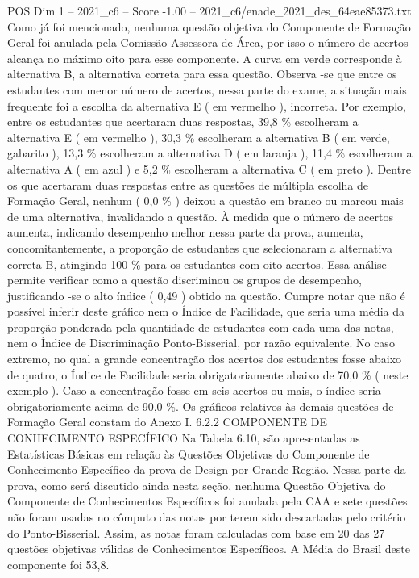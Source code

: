 \begin{textsample}{POS Dim 1 – 2021\_c6 – Score -1.00 – 2021\_c6/enade\_2021\_des\_64eae85373.txt}
Como já foi mencionado, nenhuma questão objetiva do Componente de Formação Geral foi anulada pela Comissão Assessora de Área, por isso o número de acertos alcança no máximo oito para esse componente.
A curva em verde corresponde à alternativa B, a alternativa correta para essa questão.
Observa -se que entre os estudantes com menor número de acertos, nessa parte do exame, a situação mais frequente foi a escolha da alternativa E ( em vermelho ), incorreta.
Por exemplo, entre os estudantes que acertaram duas respostas, 39,8 \% escolheram a alternativa E ( em vermelho ), 30,3 \% escolheram a alternativa B ( em verde, gabarito ), 13,3 \% escolheram a alternativa D ( em laranja ), 11,4 \% escolheram a alternativa A ( em azul ) e 5,2 \% escolheram a alternativa C ( em preto ).
Dentre os que acertaram duas respostas entre as questões de múltipla escolha de Formação Geral, nenhum ( 0,0 \% ) deixou a questão em branco ou marcou mais de uma alternativa, invalidando a questão.
À medida que o número de acertos aumenta, indicando desempenho melhor nessa parte da prova, aumenta, concomitantemente, a proporção de estudantes que selecionaram a alternativa correta B, atingindo 100 \% para os estudantes com oito acertos.
Essa análise permite verificar como a questão discriminou os grupos de desempenho, justificando -se o alto índice ( 0,49 ) obtido na questão.
Cumpre notar que não é possível inferir deste gráfico nem o Índice de Facilidade, que seria uma média da proporção ponderada pela quantidade de estudantes com cada uma das notas, nem o Índice de Discriminação Ponto-Bisserial, por razão equivalente.
No caso extremo, no qual a grande concentração dos acertos dos estudantes fosse abaixo de quatro, o Índice de Facilidade seria obrigatoriamente abaixo de 70,0 \% ( neste exemplo ).
Caso a concentração fosse em seis acertos ou mais, o índice seria obrigatoriamente acima de 90,0 \%.
Os gráficos relativos às demais questões de Formação Geral constam do Anexo I. 6.2.2 COMPONENTE DE CONHECIMENTO ESPECÍFICO Na Tabela 6.10, são apresentadas as Estatísticas Básicas em relação às Questões Objetivas do Componente de Conhecimento Específico da prova de Design por Grande Região.
Nessa parte da prova, como será discutido ainda nesta seção, nenhuma Questão Objetiva do Componente de Conhecimentos Específicos foi anulada pela CAA e sete questões não foram usadas no cômputo das notas por terem sido descartadas pelo critério do Ponto-Bisserial.
Assim, as notas foram calculadas com base em 20 das 27 questões objetivas válidas de Conhecimentos Específicos.
A Média do Brasil deste componente foi 53,8.

\end{textsample}

